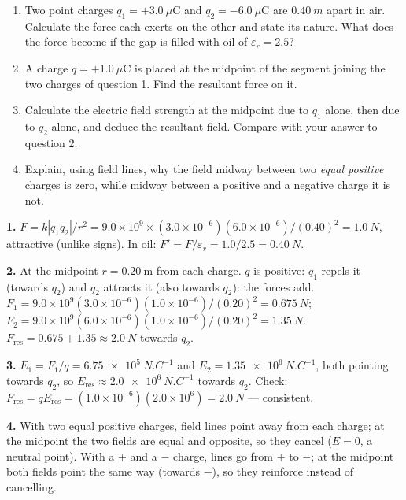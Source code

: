 \documentclass[11pt]{article}
\begin{document}
\begin{exercice}
\begin{enumerate}
\item Two point charges $q_1=+3.0\ \mu\mathrm{C}$ and $q_2=-6.0\ \mu\mathrm{C}$ are $\SI{0.40}{m}$ apart in air. Calculate the force each exerts on the other and state its nature. What does the force become if the gap is filled with oil of $\varepsilon_r=2.5$?
\item A charge $q=+1.0\ \mu\mathrm{C}$ is placed at the midpoint of the segment joining the two charges of question 1. Find the resultant force on it.
\item Calculate the electric field strength at the midpoint due to $q_1$ alone, then due to $q_2$ alone, and deduce the resultant field. Compare with your answer to question 2.
\item Explain, using field lines, why the field midway between two \emph{equal positive} charges is zero, while midway between a positive and a negative charge it is not.
\end{enumerate}
\end{exercice}

\begin{corrige}[Exercise 1]
\textbf{1.} $F=k|q_1q_2|/r^2=9.0\times10^{9}\times(3.0\times10^{-6})(6.0\times10^{-6})/(0.40)^2=\SI{1.0}{N}$, attractive (unlike signs). In oil: $F'=F/\varepsilon_r=1.0/2.5=\SI{0.40}{N}$.

\textbf{2.} At the midpoint $r=0.20\ \mathrm{m}$ from each charge. $q$ is positive: $q_1$ repels it (towards $q_2$) and $q_2$ attracts it (also towards $q_2$): the forces add.
$F_1=9.0\times10^{9}(3.0\times10^{-6})(1.0\times10^{-6})/(0.20)^2=\SI{0.675}{N}$;
$F_2=9.0\times10^{9}(6.0\times10^{-6})(1.0\times10^{-6})/(0.20)^2=\SI{1.35}{N}$.
$F_{\text{res}}=0.675+1.35\approx\SI{2.0}{N}$ towards $q_2$.

\textbf{3.} $E_1=F_1/q=\SI{6.75e5}{N.C^{-1}}$ and $E_2=\SI{1.35e6}{N.C^{-1}}$, both pointing towards $q_2$, so $E_{\text{res}}\approx\SI{2.0e6}{N.C^{-1}}$ towards $q_2$. Check: $F_{\text{res}}=qE_{\text{res}}=(1.0\times10^{-6})(2.0\times10^{6})=\SI{2.0}{N}$ — consistent.

\textbf{4.} With two equal positive charges, field lines point away from each charge; at the midpoint the two fields are equal and opposite, so they cancel ($E=0$, a neutral point). With a $+$ and a $-$ charge, lines go from $+$ to $-$; at the midpoint both fields point the same way (towards $-$), so they reinforce instead of cancelling.
\end{corrige}
\end{document}
